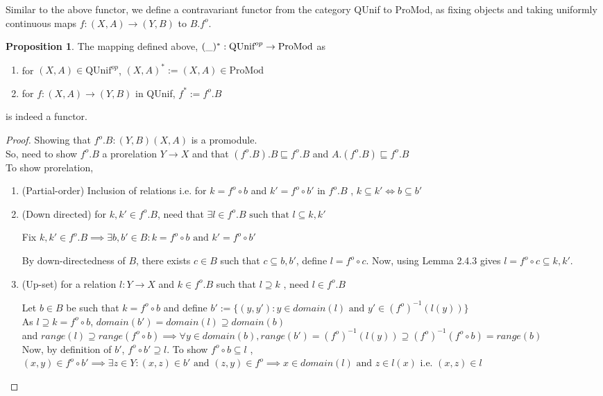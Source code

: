 \documentclass[18pt,a4paper]{article}
\makeatletter
\theoremstyle{definition}
\newtheorem{proop}[theorem]{Proposition}
\newcommand{\carrow}{}%
\DeclareRobustCommand{\carrow}{%
	\mathrel{\vphantom{\rightarrow}\mathpalette\circle@arrow\relax}%
}
\newcommand{\circle@arrow}[2]{%
	\m@th
	\ooalign{%
		\hidewidth$#1\circ\mkern1mu$\hidewidth\cr
	$#1\longrightarrow$\cr}%
}
\makeatother
\begin{document}
		Similar to the above functor, we define a contravariant functor from the category QUnif to ProMod,
		as fixing objects and taking uniformly continuous maps $f:(X,A)\to(Y,B)$ to $B.f^o$.

		\begin{proop} The mapping defined above, $(\string _)^*:\text{QUnif}^{op} \to \text{ProMod}$ as
			\begin{enumerate}[label=(\alph*)]
				\item for $(X,A) \in \text{QUnif}^{op}$, $(X,A)^*:=(X,A) \in \text{ProMod}$
				\item for $f:(X,A) \to (Y,B)$ in QUnif,
					$f^* := f^o .B$
			\end{enumerate}
			is indeed a functor.
		\end{proop}
		\begin{proof}\setcounter{equation}{0}

			Showing that $f^o .B: (Y,B) \carrow (X,A)$ is a promodule.\\
			So, need to show $f^o .B$ a prorelation $Y \to X$
			and that $(f^o .B).B \sqsubseteq f^o .B$ and $A.(f^o .B) \sqsubseteq f^o .B$ \\
			To show prorelation, \begin{enumerate}[label=(\roman*)]
				\item (Partial-order) Inclusion of relations i.e. for $k=f^o \circ b$ and
					$k'=f^o \circ b'$ in $f^o .B$ , $k \subseteq k' \iff b \subseteq b'$
				\item (Down directed) for $k,k' \in f^o .B$, need that $\exists l \in f^o .B
					\text{ such that } l \subseteq k,k'$

					Fix $k,k' \in f^o .B \implies \exists b,b' \in B : k=f^o \circ b \text{ and }
					k' = f^o \circ b'$

					By down-directedness of $B$, there exists $c \in B$ such that
					$ c \subseteq b,b'$, define $l=f^o \circ c$.
					Now, using Lemma 2.4.3 gives  $l= f^o \circ c \subseteq k,k'$.
				\item (Up-set) for a relation $l:Y \to X$ and $k \in f^o .B$ such that $l \supseteq k$
					, need $l \in f^o .B$

					Let $b\in B$ be such that $k=f^o \circ b$ and define
					$b':=\{(y,y'): y \in domain(l) \text{ and } y' \in (f^o)^{-1}(l(y))\}$\\
					As $l\supseteq k=f^o \circ b$, $domain(b')=domain(l)\supseteq domain(b)$
					\\ and $range(l) \supseteq range(f^o \circ b)\implies
					\forall y \in domain(b), range (b')=(f^o )^{-1}(l(y)) \supseteq (f^o)^{-1}(f^o \circ b ) = range(b)$\\
					Now, by definition of $b'$, $f^o \circ b' \supseteq l$. To show
					$f^o \circ b \subseteq l$ , \\
					$(x,y)\in f^o \circ b' \implies \exists z \in Y: (x,z)\in b' \text{ and }
					(z,y) \in f^o \implies x \in domain(l) \text{ and } z \in l(x)$ i.e.
					$(x,z) \in l$


\end{enumerate}
\end{proof}
\end{document}
